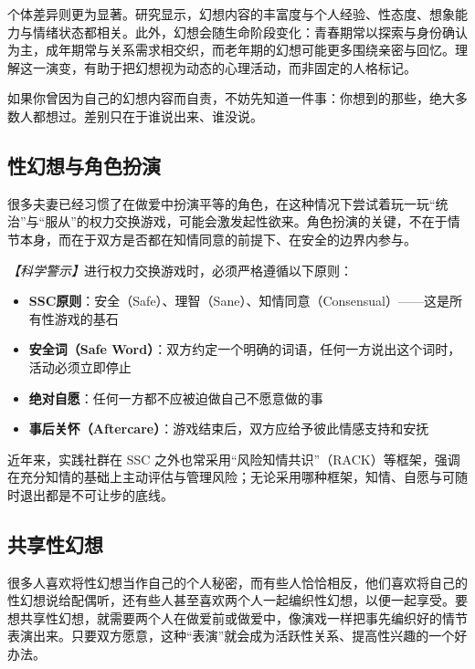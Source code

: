 个体差异则更为显著。研究显示，幻想内容的丰富度与个人经验、性态度、想象能力与情绪状态都相关。此外，幻想会随生命阶段变化：青春期常以探索与身份确认为主，成年期常与关系需求相交织，而老年期的幻想可能更多围绕亲密与回忆。理解这一演变，有助于把幻想视为动态的心理活动，而非固定的人格标记。

\begin{tcolorbox}[colback=pink!5!white,colframe=red!50!black,title=贴心小叮咛]
如果你曾因为自己的幻想内容而自责，不妨先知道一件事：你想到的那些，绝大多数人都想过。差别只在于谁说出来、谁没说。
\end{tcolorbox}

\subsection{性幻想与角色扮演}

很多夫妻已经习惯了在做爱中扮演平等的角色，在这种情况下尝试着玩一玩“统治”与“服从”的权力交换游戏，可能会激发起性欲来。角色扮演的关键，不在于情节本身，而在于双方是否都在知情同意的前提下、在安全的边界内参与。

\noindent\textit{【科学警示】}进行权力交换游戏时，必须严格遵循以下原则：
\begin{itemize}
  \item \textbf{SSC原则}：安全（Safe）、理智（Sane）、知情同意（Consensual）——这是所有性游戏的基石
  \item \textbf{安全词（Safe Word）}：双方约定一个明确的词语，任何一方说出这个词时，活动必须立即停止
  \item \textbf{绝对自愿}：任何一方都不应被迫做自己不愿意做的事
  \item \textbf{事后关怀（Aftercare）}：游戏结束后，双方应给予彼此情感支持和安抚
\end{itemize}

近年来，实践社群在 SSC 之外也常采用“风险知情共识”（RACK）等框架，强调在充分知情的基础上主动评估与管理风险；无论采用哪种框架，知情、自愿与可随时退出都是不可让步的底线。

\subsection{共享性幻想}

很多人喜欢将性幻想当作自己的个人秘密，而有些人恰恰相反，他们喜欢将自己的性幻想说给配偶听，还有些人甚至喜欢两个人一起编织性幻想，以便一起享受。要想共享性幻想，就需要两个人在做爱前或做爱中，像演戏一样把事先编织好的情节表演出来。只要双方愿意，这种“表演”就会成为活跃性关系、提高性兴趣的一个好办法。

